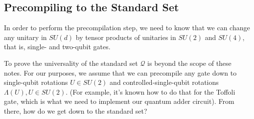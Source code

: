 \documentclass{article}
\theoremstyle{plain}
\newtheorem{theorem}{Theorem}
\begin{document}
\subsection{Precompiling to the Standard Set}
\label{subsec:precompile}

In order to perform the precompilation step, we need to know that we can
change any unitary in $SU(d)$ by tensor products of unitaries in $SU(2)$
and $SU(4)$, that is, single- and two-qubit gates.

To prove the universality of the standard set $\mathcal{Q}$ is beyond the
scope of these notes. For our purposes, we assume that we can precompile
any gate down to single-qubit rotations $U \in SU(2)$ and
controlled-single-qubit rotations $\Lambda(U), U\in SU(2)$.
(For example, it's known how to do that for the Toffoli gate, which is what we
need to implement our quantum adder circuit).
From there, how do we get down to the standard set?

%
%
%
\end{document}
